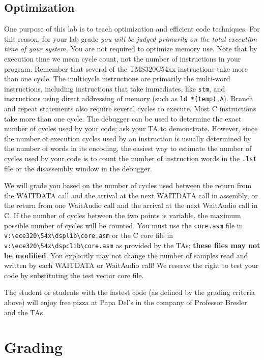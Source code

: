 \subsection{Optimization}
One purpose of this lab is to teach optimization and efficient
code techniques. For this reason, for your lab grade 
\emph{you will be judged primarily on the total execution
time of your system.}  You are not required to optimize memory 
use.  Note that by execution time we mean
cycle count, not the number of instructions in your program.
Remember that several of the TMS320C54xx instructions take
more than one cycle. The multicycle instructions are primarily
the multi-word instructions, including instructions that
take immediates, like \verb+stm+, and instructions using 
direct addressing of memory (such as \verb+ld *(temp),A+).
Branch and repeat statements also require several cycles
to execute.  Most C instructions take more than one cycle.
The debugger can be used to
determine the exact number of cycles used by your code; 
ask your TA to demonstrate. 
However, since the number of
execution cycles used by an instruction is usually determined
by the number of words in its encoding, the easiest way to estimate 
the number of cycles used by your code is to count the number
of instruction words in the \verb+.lst+ file or the disassembly
window in the debugger.

We will grade you based on the number of cycles used between
the return from the WAITDATA call and the arrival at the next
WAITDATA call in assembly, or the return from one WaitAudio call 
and the arrival at the next WaitAudio call in C. If the number of 
cycles between the two points  is variable, the maximum possible 
number of cycles will be counted. You must use the \verb+core.asm+ file 
in \verb+v:\ece320\54x\dsplib\core.asm+ or 
the C core file in  \verb+v:\ece320\54x\dspclib\core.asm+ as provided 
by the TAs;  
{\bf these files may not be modified}. You explicitly may not change the 
number of samples read and written by each WAITDATA or WaitAudio call! 
We reserve the right to test your code by substituting the test vector
core file.

The student or students with the fastest code (as defined
by the grading criteria above) will enjoy free pizza at 
Papa Del's in the company of Professor Bresler and the TAs.


\section{Grading}

